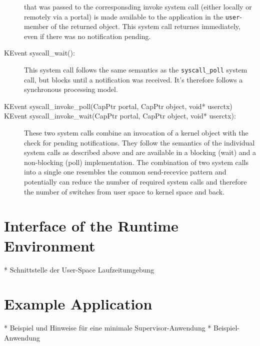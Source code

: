 \begin{description}
that was passed to the corresponsding invoke system call (either locally or
remotely via a portal) is made available to the application in the
\texttt{user}-member of the returned object. This system call returnes
immediately, even if there was no notification pending.
\item[KEvent syscall\_wait():] This system call follows the same semantics as
the \texttt{syscall\_poll} system call, but blocks until a notification was
received. It's therefore follows a synchronous processing model.
\item[KEvent syscall\_invoke\_poll(CapPtr portal, CapPtr object, void* userctx)]
\item[KEvent syscall\_invoke\_wait(CapPtr portal, CapPtr object, void*
userctx):] These two system calls combine an invocation of a kernel object with
the check for pending notifications. They follow the semantics of the individual
system calls as described above and are available in a blocking (wait) and a
non-blocking (poll) implementation. The combination of two system calls into a
single one resembles the common send-recevice pattern and potentially can reduce
the number of required system calls and therefore the number of switches from
user space to kernel space and back.
\end{description}

\section{Interface of the \mythos Runtime Environment}
* Schnittstelle der User-Space Laufzeitumgebung

\section{Example Application}
* Beispiel und Hinweise für eine minimale Supervisor-Anwendung
* Beispiel-Anwendung

% 
% 



